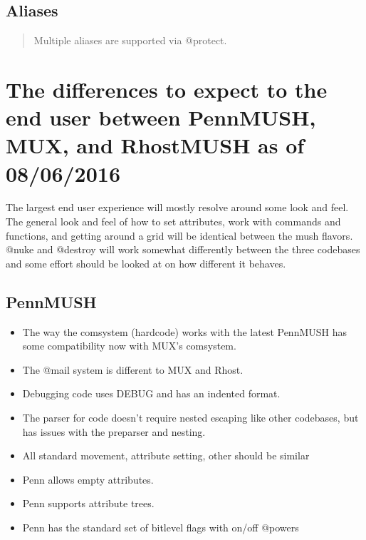 \documentclass[letterpaper,10pt,english]{sphinxmanual}
\begin{document}
\section{Aliases}
\label{\detokenize{10-customize:aliases}}\begin{quote}

\sphinxAtStartPar
Multiple aliases are supported via @protect.
\end{quote}


\chapter{The differences to expect to the end user between PennMUSH, MUX, and RhostMUSH as of 08/06/2016}
\label{\detokenize{11-differences:the-differences-to-expect-to-the-end-user-between-pennmush-mux-and-rhostmush-as-of-08-06-2016}}\label{\detokenize{11-differences::doc}}
\sphinxAtStartPar
The largest end user experience will mostly resolve around some look and feel.
The general look and feel of how to set attributes, work with commands and
functions, and getting around a grid will be identical between the mush flavors.
@nuke and @destroy will work somewhat differently between the three codebases
and some effort should be looked at on how different it behaves.


\section{PennMUSH}
\label{\detokenize{11-differences:pennmush}}\begin{itemize}
\item {} 
\sphinxAtStartPar
The way the comsystem (hardcode) works with the latest PennMUSH has some
compatibility now with MUX’s comsystem.

\item {} 
\sphinxAtStartPar
The @mail system is different to MUX and Rhost.

\item {} 
\sphinxAtStartPar
Debugging code uses DEBUG and has an indented format.

\item {} 
\sphinxAtStartPar
The parser for code doesn’t require nested escaping like other codebases, but
has issues with the pre\sphinxhyphen{}parser and nesting.

\item {} 
\sphinxAtStartPar
All standard movement, attribute setting, other should be similar

\item {} 
\sphinxAtStartPar
Penn allows empty attributes.

\item {} 
\sphinxAtStartPar
Penn supports attribute trees.

\item {} 
\sphinxAtStartPar
Penn has the standard set of bitlevel flags with on/off @powers

\end{itemize}
\end{document}
